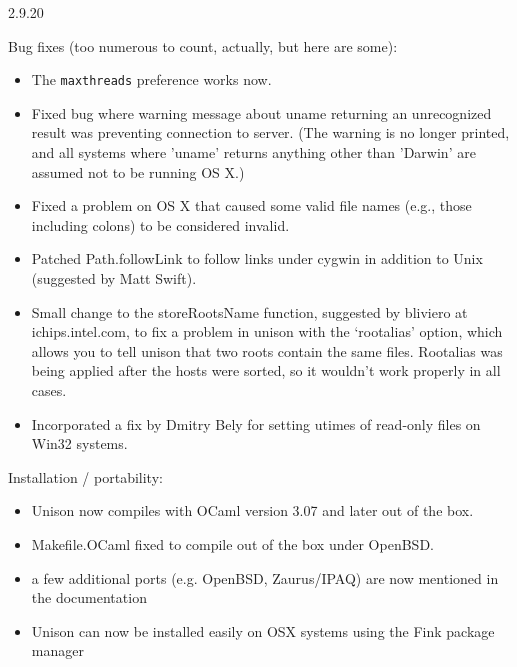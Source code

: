 \begin{changesfromversion}{2.9.20}
\item Bug fixes (too numerous to count, actually, but here are some):
\begin{itemize}
\item The {\tt maxthreads} preference works now.
\item Fixed bug where warning message about uname returning an unrecognized
  result was preventing connection to server.  (The warning is no longer
  printed, and all systems where 'uname' returns anything other than 'Darwin' 
  are assumed not to be running OS X.)
\item Fixed a problem on OS X that caused some valid file names (e.g.,
  those including colons) to be considered invalid.
\item Patched Path.followLink to follow links under cygwin in addition to Unix
  (suggested by Matt Swift).
\item Small change to the storeRootsName function, suggested by bliviero at 
  ichips.intel.com, to fix a problem in unison with the `rootalias'
  option, which allows you to tell unison that two roots contain the same 
  files.  Rootalias was being applied after the hosts were 
  sorted, so it wouldn't work properly in all cases.
\item Incorporated a fix by Dmitry Bely for setting utimes of read-only files
  on Win32 systems.   
\end{itemize}

\item Installation / portability:
\begin{itemize}
\item Unison now compiles with OCaml version 3.07 and later out of the box.
\item Makefile.OCaml fixed to compile out of the box under OpenBSD.
\item a few additional ports (e.g. OpenBSD, Zaurus/IPAQ) are now mentioned in 
  the documentation 
\item Unison can now be installed easily on OSX systems using the Fink
  package manager
\end{itemize}
\end{changesfromversion}


